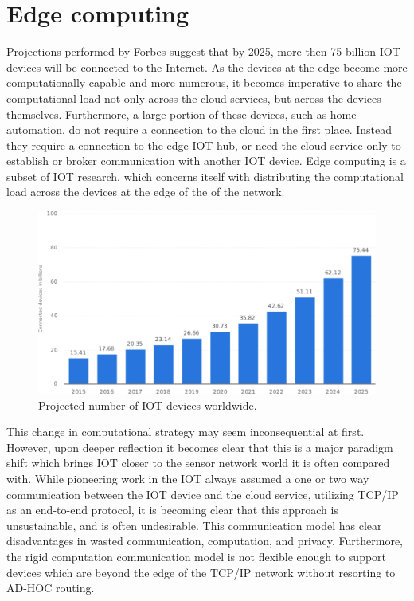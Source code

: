 \section{Edge computing}
Projections performed by Forbes suggest that by 2025, more then 75 billion IOT devices will be connected to the Internet.\cite{forbesiot} As the devices at the edge become more computationally capable and more numerous, it becomes imperative to share the computational load not only across the cloud services, but across the devices themselves.
Furthermore, a large portion of these devices, such as home automation, do not require a connection to the cloud in the first place.
Instead they require a connection to the edge IOT hub, or need the cloud service only to establish or broker communication with another IOT device.
Edge computing is a subset of IOT research, which concerns itself with distributing the computational load across the devices at the edge of the of the network. \cite{satyanarayanan2017emergence}
\begin{figure}[h]
    \centering
    \includegraphics[width=0.8\linewidth]{img/iot_statistics.pdf}
    \caption{Projected number of IOT devices worldwide.\cite{forbesiot}}
    \label{lit:fig:1}
\end{figure}

This change in computational strategy may seem inconsequential at first.
However, upon deeper reflection it becomes clear that this is a major paradigm shift which brings IOT closer to the sensor network world it is often compared with.
While pioneering work in the IOT always assumed a one or two way communication between the IOT device and the cloud service, utilizing TCP/IP as an end-to-end protocol, it is becoming clear that this approach is unsustainable, and is often undesirable.
This communication model has clear disadvantages in wasted communication, computation, and privacy.
Furthermore, the rigid computation communication model is not flexible enough to support devices which are beyond the edge of the TCP/IP network without resorting to AD-HOC routing. \cite{gagliardi2011content}

